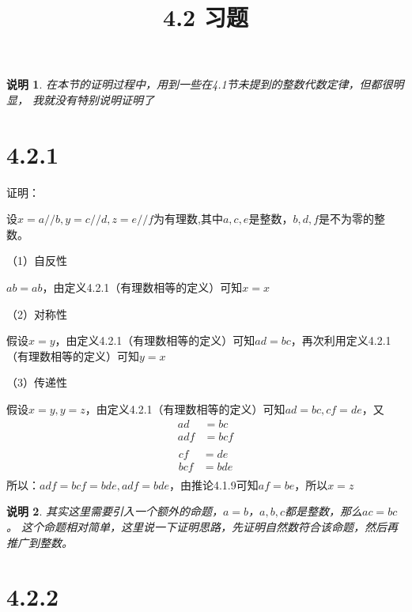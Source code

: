 \documentclass{article}
\theoremstyle{mystyle}
\newtheorem*{zremark}{说明}
\begin{document}
\title{4.2 习题}
\maketitle

\begin{zgraytheorem}
  \begin{zremark}
    在本节的证明过程中，用到一些在4.1节未提到的整数代数定律，但都很明显，
    我就没有特别说明证明了
  \end{zremark}
\end{zgraytheorem}

\section*{4.2.1}

证明：

设$x=a//b,y=c//d,z=e//f$为有理数,其中$a,c,e$是整数，$b,d,f$是不为零的整数。

（1）自反性

$ab=ab$，由定义4.2.1（有理数相等的定义）可知$x=x$

（2）对称性

假设$x=y$，由定义4.2.1（有理数相等的定义）可知$ad=bc$，再次利用定义4.2.1（有理数相等的定义）可知$y=x$

（3）传递性

假设$x=y,y=z$，由定义4.2.1（有理数相等的定义）可知$ad=bc,cf=de$，又
\begin{align*}
  ad  & = bc  \\
  adf & = bcf \\
\end{align*}
\begin{align*}
  cf  & = de  \\
  bcf & = bde \\
\end{align*}
所以：$adf = bcf = bde, adf = bde$，由推论4.1.9可知$af=be$，所以$x=z$

\begin{zgraytheorem}
  \begin{zremark}
    其实这里需要引入一个额外的命题，$a=b$，$a,b,c$都是整数，那么$ac=bc$。
    这个命题相对简单，这里说一下证明思路，先证明自然数符合该命题，然后再推广到整数。
  \end{zremark}
\end{zgraytheorem}

\section*{4.2.2}
\end{document}
